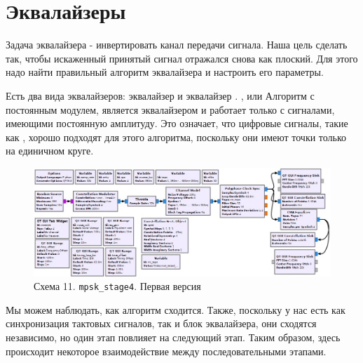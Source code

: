 \documentclass[a4paper, 12pt]{report}
\begin{document}
	\chapter{Эквалайзеры}
	Задача эквалайзера - инвертировать канал передачи сигнала. Наша цель сделать так, чтобы искаженный принятый сигнал отражался снова как плоский. Для этого надо найти правильный алгоритм эквалайзера и настроить его параметры.

	Есть два вида эквалайзеров: эквалайзер  и эквалайзер . , или Алгоритм с постоянным модулем, является  эквалайзером и работает только с сигналами, имеющими постоянную амплитуду. Это означает, что цифровые сигналы, такие как , хорошо подходят для этого алгоритма, поскольку они имеют точки только на единичном круге.
	\begin{figure}[H]
		\centering
		\includegraphics[width=1.0\textwidth]{27.jpg}
		\caption{Схема 11. \texttt{mpsk\_stage4}. Первая версия}
		\label{fig:27}
	\end{figure}
	Мы можем наблюдать, как алгоритм  сходится. Также, поскольку у нас есть как синхронизация тактовых сигналов, так и блок эквалайзера, они сходятся независимо, но один этап повлияет на следующий этап. Таким образом, здесь происходит некоторое взаимодействие между последовательными этапами.
	
\end{document}
